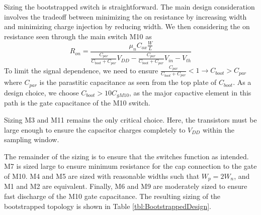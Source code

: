 \documentclass[10pt,journal]{IEEEtran}\usepackage{longtable}
\begin{document}
Sizing the bootstrapped switch is straightforward. The main design consideration involves the tradeoff between minimizing the on resistance by increasing width and minimizing charge injection by reducing width. 
We then considering the on resistance seen through the main switch M10 as
\begin{equation}
R_{on}=\frac{\mu_nC_{ox}\frac{W}{L}}{\frac{C_{par}}{C_{boot}+C_{par}}V_{DD}-\frac{C_{par}}{C_{boot}+C_{par}}V_{in}-V_{th}}
\end{equation}
To limit the signal dependence, we need to ensure $\frac{C_{par}}{C_{boot}+C_{par}}<1\rightarrow C_{boot}>C_{par}$ where $C_{par}$ is the parastitic capacitance as seen from the top plate of $C_{boot}$. As a design choice, we choose $C_{boot}>10C_{gM10}$, as the major capactive element in this path is the gate capacitance of the M10 switch. 

Sizing M3 and M11 remains the only critical choice. Here, the transistors must be large enough to ensure the capacitor charges completely to $V_{DD}$ within the sampling window. 

The remainder of the sizing is to ensure that the switches function as intended. M7 is sized large to ensure minimum resistance for the cap connection to the gate of M10. M4 and M5 are sized with reasonable widths such that $W_p=2W_n$, and M1 and M2 are equivalent. Finally, M6 and M9 are moderately sized to ensure fast discharge of the M10 gate capacitance. The resulting sizing of the bootstrapped topology is shown in Table \ref{tbl:BootstrappedDesign}.
\end{document}
